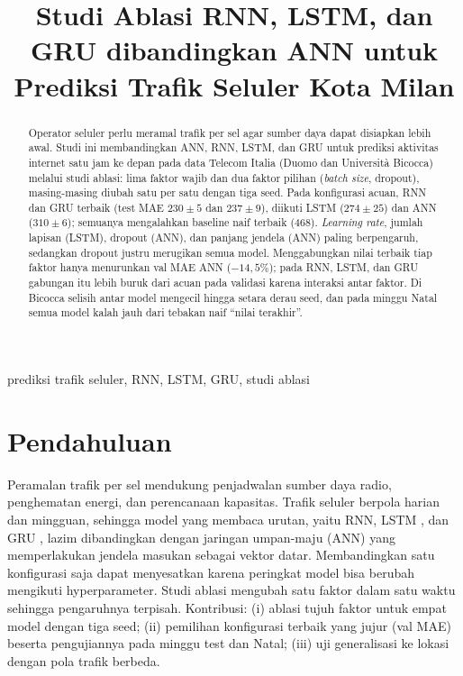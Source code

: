 \documentclass[conference,a4paper]{IEEEtran}
\begin{document}
\title{Studi Ablasi RNN, LSTM, dan GRU dibandingkan ANN untuk Prediksi Trafik Seluler Kota Milan}
\author{
}
\maketitle

\begin{abstract}
Operator seluler perlu meramal trafik per sel agar sumber daya dapat disiapkan lebih awal. Studi ini membandingkan ANN, RNN, LSTM, dan GRU untuk prediksi aktivitas internet satu jam ke depan pada data Telecom Italia (Duomo dan Universit\`a Bicocca) melalui studi ablasi: lima faktor wajib dan dua faktor pilihan (\textit{batch size}, dropout), masing-masing diubah satu per satu dengan tiga seed. Pada konfigurasi acuan, RNN dan GRU terbaik (test MAE $230\pm5$ dan $237\pm9$), diikuti LSTM ($274\pm25$) dan ANN ($310\pm6$); semuanya mengalahkan baseline naif terbaik (468). \textit{Learning rate}, jumlah lapisan (LSTM), dropout (ANN), dan panjang jendela (ANN) paling berpengaruh, sedangkan dropout justru merugikan semua model. Menggabungkan nilai terbaik tiap faktor hanya menurunkan val MAE ANN ($-14{,}5\%$); pada RNN, LSTM, dan GRU gabungan itu lebih buruk dari acuan pada validasi karena interaksi antar faktor. Di Bicocca selisih antar model mengecil hingga setara derau seed, dan pada minggu Natal semua model kalah jauh dari tebakan naif ``nilai terakhir''.
\end{abstract}
\begin{IEEEkeywords}
prediksi trafik seluler, RNN, LSTM, GRU, studi ablasi
\end{IEEEkeywords}

\section{Pendahuluan}
Peramalan trafik per sel mendukung penjadwalan sumber daya radio, penghematan energi, dan perencanaan kapasitas. Trafik seluler berpola harian dan mingguan, sehingga model yang membaca urutan, yaitu RNN, LSTM \cite{hochreiter1997lstm}, dan GRU \cite{cho2014gru}, lazim dibandingkan dengan jaringan umpan-maju (ANN) yang memperlakukan jendela masukan sebagai vektor datar. Membandingkan satu konfigurasi saja dapat menyesatkan karena peringkat model bisa berubah mengikuti hyperparameter. Studi ablasi mengubah satu faktor dalam satu waktu sehingga pengaruhnya terpisah. Kontribusi: (i) ablasi tujuh faktor untuk empat model dengan tiga seed; (ii) pemilihan konfigurasi terbaik yang jujur (val MAE) beserta pengujiannya pada minggu test dan Natal; (iii) uji generalisasi ke lokasi dengan pola trafik berbeda.
\end{document}

